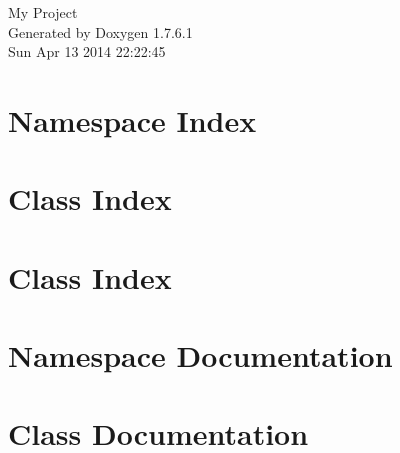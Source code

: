 \documentclass[a4paper]{book}
\begin{document}
\hypersetup{pageanchor=false,citecolor=blue}
\begin{titlepage}
\vspace*{7cm}
\begin{center}
{\Large \-My \-Project }\\
\vspace*{1cm}
{\large \-Generated by Doxygen 1.7.6.1}\\
\vspace*{0.5cm}
{\small Sun Apr 13 2014 22:22:45}\\
\end{center}
\end{titlepage}
\clearemptydoublepage
{}
\tableofcontents
\clearemptydoublepage
{}
\hypersetup{pageanchor=true,citecolor=blue}
\chapter{\-Namespace \-Index}

\chapter{\-Class \-Index}

\chapter{\-Class \-Index}

\chapter{\-Namespace \-Documentation}





\chapter{\-Class \-Documentation}

















































\printindex
\end{document}
